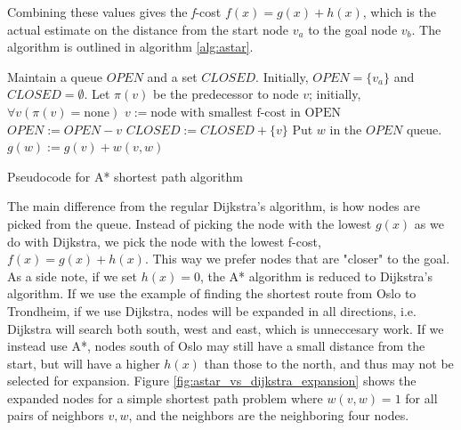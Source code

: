Combining these values gives the {\textit f-cost} $f(x) = g(x)+h(x)$, which is the actual estimate on the distance from the start node $v_a$ to the goal node $v_b$. The algorithm is outlined in algorithm \ref{alg:astar}.

\begin{algorithm}
\begin{algorithmic}
\STATE Maintain a queue $OPEN$ and a set $CLOSED$. 
\STATE Initially, $OPEN = \{v_a\}$ and $CLOSED = \emptyset$. 
\STATE Let $\pi(v)$ be the predecessor to node $v$; initially, $\forall v (\pi(v) = \mbox{none})$ 
    \STATE $v := \mbox{node with smallest f-cost in OPEN}$
    \STATE $OPEN:= OPEN - {v}$
    \STATE $CLOSED := CLOSED + \{v\}$
            \STATE Put $w$ in the $OPEN$ queue.
            \STATE $g(w) := g(v)+w(v,w)$
        \ENDIF
    \ENDFOR
\ENDWHILE
\end{algorithmic}
\caption{Pseudocode for A* shortest path algorithm}
\label{alg:astar}
\end{algorithm}

The main difference from the regular Dijkstra's algorithm, is how nodes are picked from the queue. Instead of picking the node with the lowest $g(x)$ as we do with Dijkstra, we pick the node with the lowest f-cost, $f(x) = g(x) + h(x)$. This way we prefer nodes that are "closer" to the goal. As a side note, if we set $h(x)=0$, the A* algorithm is reduced to Dijkstra's algorithm. If we use the example of finding the shortest route from Oslo to Trondheim, if we use Dijkstra, nodes will be expanded in all directions, i.e. Dijkstra will search both south, west and east, which is unneccesary work. If we instead use A*, nodes south of Oslo may still have a small distance from the start, but will have a higher $h(x)$ than those to the north, and thus may not be selected for expansion. Figure \ref{fig:astar_vs_dijkstra_expansion} shows the expanded nodes for a simple shortest path problem where $w(v,w)=1$ for all pairs of neighbors $v,w$, and the neighbors are the neighboring four nodes.

